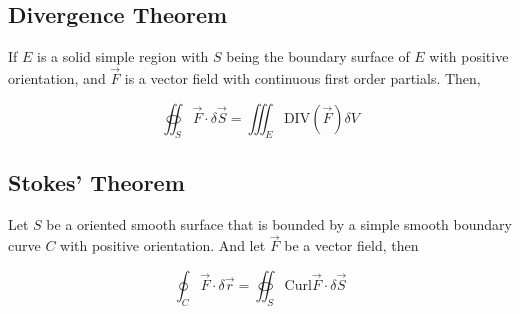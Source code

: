 \documentclass{article}
\begin{document}
\subsection{Divergence Theorem}

If $E$ is a solid simple region with $S$ being the boundary surface of $E$ with positive orientation, and $\vec{F}$ is a vector field with continuous first order partials. Then,

$$\oiint_S \vec{F} \cdot \delta \vec{S} = \iiint_E \text{DIV} (\vec{F}) \delta V$$

\subsection{Stokes' Theorem}

Let $S$ be a oriented smooth surface that is bounded by a simple smooth boundary curve $C$ with positive orientation. And let $\vec{F}$ be a vector field, then

$$\oint_C \vec{F} \cdot \delta \vec{r} = \oiint_{S} \text{Curl}\vec{F} \cdot \delta \vec{S}$$
\end{document}
